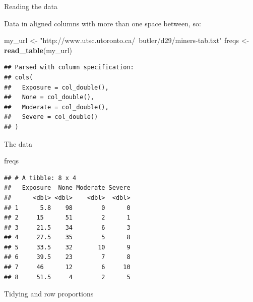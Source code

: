 \documentclass[ignorenonframetext,]{beamer}
\newenvironment{Shaded}{\begin{snugshade}}{\end{snugshade}}
\newcommand{\DataTypeTok}[1]{\textcolor[rgb]{0.13,0.29,0.53}{#1}}
\newcommand{\KeywordTok}[1]{\textcolor[rgb]{0.13,0.29,0.53}{\textbf{#1}}}
\newcommand{\NormalTok}[1]{#1}
\newcommand{\OperatorTok}[1]{\textcolor[rgb]{0.81,0.36,0.00}{\textbf{#1}}}
\newcommand{\StringTok}[1]{\textcolor[rgb]{0.31,0.60,0.02}{#1}}
\begin{document}
\begin{frame}[fragile]{Reading the data}
\protect\hypertarget{reading-the-data}{}

Data in aligned columns with more than one space between, so:

\small

\begin{Shaded}
\begin{Highlighting}[]
\NormalTok{my_url <-}\StringTok{ "http://www.utsc.utoronto.ca/~butler/d29/miners-tab.txt"}
\NormalTok{freqs <-}\StringTok{ }\KeywordTok{read_table}\NormalTok{(my_url)}
\end{Highlighting}
\end{Shaded}

\begin{verbatim}
## Parsed with column specification:
## cols(
##   Exposure = col_double(),
##   None = col_double(),
##   Moderate = col_double(),
##   Severe = col_double()
## )
\end{verbatim}

\normalsize

\end{frame}

\begin{frame}[fragile]{The data}
\protect\hypertarget{the-data-3}{}

\begin{Shaded}
\begin{Highlighting}[]
\NormalTok{freqs}
\end{Highlighting}
\end{Shaded}

\begin{verbatim}
## # A tibble: 8 x 4
##   Exposure  None Moderate Severe
##      <dbl> <dbl>    <dbl>  <dbl>
## 1      5.8    98        0      0
## 2     15      51        2      1
## 3     21.5    34        6      3
## 4     27.5    35        5      8
## 5     33.5    32       10      9
## 6     39.5    23        7      8
## 7     46      12        6     10
## 8     51.5     4        2      5
\end{verbatim}

\end{frame}

\begin{frame}[fragile]{Tidying and row proportions}
\protect\hypertarget{tidying-and-row-proportions}{}

\begin{Shaded}
\end{Shaded}

\end{frame}
\end{document}
